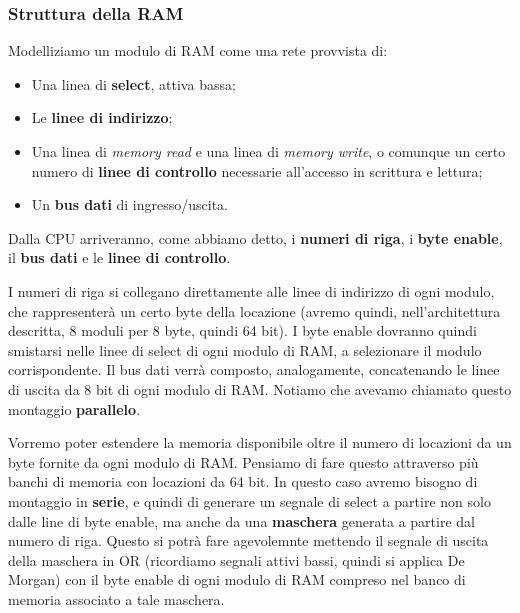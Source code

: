 \documentclass[a4paper,11pt]{article}
\begin{document}
\subsubsection{Struttura della RAM}
Modelliziamo un modulo di RAM come una rete provvista di:
\begin{itemize}
	\item Una linea di \textbf{select}, attiva bassa;
	\item Le \textbf{linee di indirizzo};
	\item Una linea di \textit{memory read} e una linea di \textit{memory write}, o comunque un certo numero di \textbf{linee di controllo} necessarie all'accesso in scrittura e lettura;
	\item Un \textbf{bus dati} di ingresso/uscita. 
\end{itemize}

Dalla CPU arriveranno, come abbiamo detto, i \textbf{numeri di riga}, i \textbf{byte enable}, il \textbf{bus dati} e le \textbf{linee di controllo}.

I numeri di riga si collegano direttamente alle linee di indirizzo di ogni modulo, che rappresenterà un certo byte della locazione (avremo quindi, nell'architettura descritta, 8 moduli per 8 byte, quindi 64 bit).
I byte enable dovranno quindi smistarsi nelle linee di select di ogni modulo di RAM, a selezionare il modulo corrispondente.
Il bus dati verrà composto, analogamente, concatenando le linee di uscita da 8 bit di ogni modulo di RAM. 
Notiamo che avevamo chiamato questo montaggio \textbf{parallelo}.

\par\smallskip 

Vorremo poter estendere la memoria disponibile oltre il numero di locazioni da un byte fornite da ogni modulo di RAM.
Pensiamo di fare questo attraverso più banchi di memoria con locazioni da 64 bit.
In questo caso avremo bisogno di montaggio in \textbf{serie}, e quindi di generare un segnale di select a partire non solo dalle line di byte enable, ma anche da una \textbf{maschera} generata a partire dal numero di riga.
Questo si potrà fare agevolemnte mettendo il segnale di uscita della maschera in OR (ricordiamo segnali attivi bassi, quindi si applica De Morgan) con il byte enable di ogni modulo di RAM compreso nel banco di memoria associato a tale maschera.
\end{document}
